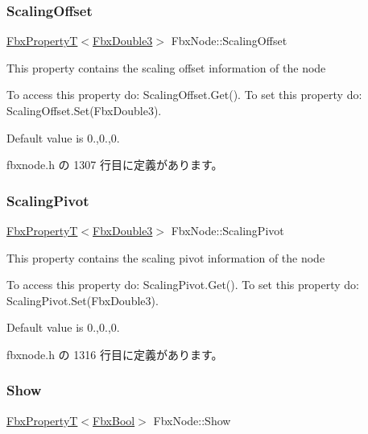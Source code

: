\subsubsection{\texorpdfstring{Scaling\+Offset}{ScalingOffset}}
{\footnotesize\ttfamily \hyperlink{class_fbx_property_t}{Fbx\+PropertyT}$<$\hyperlink{fbxtypes_8h_ae0a96f14cde566774c7553aa7523b7a7}{Fbx\+Double3}$>$ Fbx\+Node\+::\+Scaling\+Offset}

This property contains the scaling offset information of the node

To access this property do\+: Scaling\+Offset.\+Get(). To set this property do\+: Scaling\+Offset.\+Set(\+Fbx\+Double3).

Default value is 0.,0.,0. 

 fbxnode.\+h の 1307 行目に定義があります。

\mbox{\label{class_fbx_node_ab7f341494efcbee371d417a9bf19d040}} 
\subsubsection{\texorpdfstring{Scaling\+Pivot}{ScalingPivot}}
{\footnotesize\ttfamily \hyperlink{class_fbx_property_t}{Fbx\+PropertyT}$<$\hyperlink{fbxtypes_8h_ae0a96f14cde566774c7553aa7523b7a7}{Fbx\+Double3}$>$ Fbx\+Node\+::\+Scaling\+Pivot}

This property contains the scaling pivot information of the node

To access this property do\+: Scaling\+Pivot.\+Get(). To set this property do\+: Scaling\+Pivot.\+Set(\+Fbx\+Double3).

Default value is 0.,0.,0. 

 fbxnode.\+h の 1316 行目に定義があります。

\mbox{\label{class_fbx_node_a685ccf0b6e1bc5070c28d9e7a8823c74}} 
\subsubsection{\texorpdfstring{Show}{Show}}
{\footnotesize\ttfamily \hyperlink{class_fbx_property_t}{Fbx\+PropertyT}$<$\hyperlink{fbxtypes_8h_a92e0562b2fe33e76a242f498b362262e}{Fbx\+Bool}$>$ Fbx\+Node\+::\+Show}

